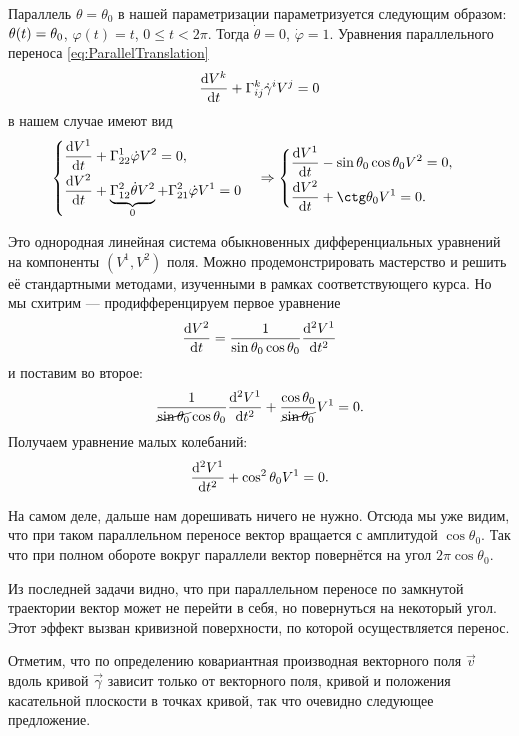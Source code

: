 \begin{firstsolution}
	Параллель $\theta = \theta_0$ в нашей параметризации параметризуется следующим образом: $\theta(t) \hm= \theta_0$, $\varphi(t) = t$, $0 \leqslant t < 2\pi$. Тогда $\dot{\theta} = 0$, $\dot{\varphi} = 1$. Уравнения параллельного переноса \eqref{eq:ParallelTranslation}
	\[
		\frac{\mathop{}\!\mathrm{d} V^k}{\mathop{}\!\mathrm{d} t} + \Gamma_{ij}^k\dot{\gamma}^iV^j = 0
	\]
	в нашем случае имеют вид
	\[
		\begin{cases}
			\begin{aligned}
				&\frac{\d V^1}{\d t} + \Gamma_{22}^1\dot{\varphi}V^2 = 0,\\
				&\frac{\d V^2}{\d t} + \underbrace{\Gamma_{12}^2\dot{\theta}V^2}_{0} + \Gamma_{21}^2\dot{\varphi}V^1 = 0
			\end{aligned}
		\end{cases} \Rightarrow
		\begin{cases}
			\begin{aligned}
				&\frac{\d V^1}{\d t} - \sin\theta_0\cos\theta_0V^2 = 0,\\
				&\frac{\d V^2}{\d t} + \ctg\theta_0V^1 = 0.
			\end{aligned}
		\end{cases}
	\]

	Это однородная линейная система обыкновенных дифференциальных уравнений на компоненты $(V^1, V^2)$ поля. Можно продемонстрировать мастерство и решить её стандартными методами, изученными в рамках соответствующего курса. Но мы схитрим --- продифференцируем первое уравнение
	\[
		\frac{\mathop{}\!\mathrm{d} V^2}{\mathop{}\!\mathrm{d} t} = \frac{1}{\sin\theta_0\cos\theta_0}\frac{\mathop{}\!\mathrm{d}^2V^1}{\mathop{}\!\mathrm{d} t^2}
	\]
	и поставим во второе:
	\[
		\frac{1}{\cancel{\sin\theta_0}\cos\theta_0}\frac{\mathop{}\!\mathrm{d}^2V^1}{\mathop{}\!\mathrm{d} t^2} + \frac{\cos\theta_0}{\cancel{\sin\theta_0}}V^1 = 0.
	\]
	Получаем уравнение малых колебаний:
	\[
		\frac{\mathop{}\!\mathrm{d}^2V^1}{\mathop{}\!\mathrm{d} t^2} + \cos^2\theta_0V^1 = 0.
	\]

	На самом деле, дальше нам дорешивать ничего не нужно. Отсюда мы уже видим, что при таком параллельном переносе вектор вращается с амплитудой $\cos\theta_0$. Так что при полном обороте вокруг параллели вектор повернётся на угол $2\pi\cos\theta_0$.
\end{firstsolution}

Из последней задачи видно, что при параллельном переносе по замкнутой траектории вектор может не перейти в себя, но повернуться на некоторый угол. Этот эффект вызван кривизной поверхности, по которой осуществляется перенос.

Отметим, что по определению ковариантная производная векторного поля $\vec{v}$ вдоль кривой $\vec{\gamma}$ зависит только от векторного поля, кривой и положения касательной плоскости в точках кривой, так что очевидно следующее предложение.

